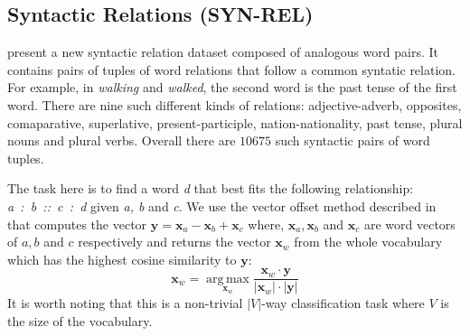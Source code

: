\documentclass[11pt]{article}
\DeclareMathOperator*{\argmax}{arg\,max}
\begin{document}

\subsection{Syntactic Relations (SYN-REL)}
\label{sec:syn-rel}

 present a new syntactic relation dataset composed of analogous word pairs. 
It contains pairs of tuples of word relations that follow a common syntatic relation. For example, in \textit{walking} and \textit{walked}, the second word is the past tense
of the first word. There are nine such different kinds of relations: adjective-adverb,
opposites, comaparative, superlative, present-participle, 
nation-nationality, past tense, plural nouns and plural verbs.
Overall there are $10675$ such syntactic pairs of word tuples.

The task here is to find a word \textit{d} that best fits the following relationship: 
\textit{a~:~b~::~c~:~d} given \textit{a, b} and \textit{c}. 
We use the vector offset method described in 
 that computes the vector $\boldsymbol{y} = \boldsymbol{x}_a - \boldsymbol{x}_b + \boldsymbol{x}_c$ where, 
$\boldsymbol{x}_a, \boldsymbol{x}_b$ and $\boldsymbol{x}_c$ are word vectors of $a, b$ and $c$ respectively and returns the 
vector $\boldsymbol{x}_w$ from the whole vocabulary which has the highest cosine similarity to $\boldsymbol{y}$:
\begin{equation}
\boldsymbol{x}_w = \underset{\boldsymbol{x}_w}{\argmax}\frac{\boldsymbol{x}_w \cdot \boldsymbol{y}}{\left| \boldsymbol{x}_w \right| \cdot \left| \boldsymbol{y} \right|}
\end{equation}
It is worth noting that this is a non-trivial $\left|V\right|$-way classification task
where $V$ is the size of the vocabulary.
\end{document}
